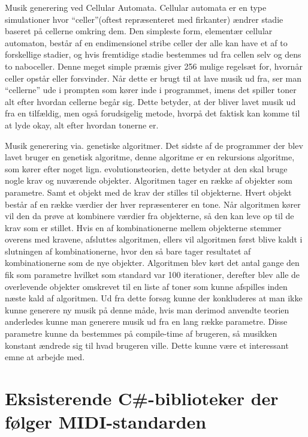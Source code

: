 Musik generering ved Cellular Automata.
Cellular automata er en type simulationer hvor “celler”(oftest repræsenteret med firkanter) ændrer stadie baseret på cellerne omkring dem. Den simpleste form, elementær cellular automaton, består af en endimensionel stribe celler der alle kan have et af to forskellige stadier, og hvis fremtidige stadie bestemmes ud fra cellen selv og dens to naboceller. Denne meget simple præmis giver 256 mulige regelsæt for, hvornår celler opstår eller forsvinder.\cite{wolframCA}
Når dette er brugt til at lave musik ud fra, ser man “cellerne” ude i prompten som kører inde i programmet, imens det spiller toner alt efter hvordan cellerne begår sig. Dette betyder, at der bliver lavet musik ud fra en tilfældig, men også forudsigelig metode, hvorpå det faktisk kan komme til at lyde okay, alt efter hvordan tonerne er. \cite{citation+needed}

Musik generering via. genetiske algoritmer.
Det sidste af de programmer der blev lavet bruger en genetisk algoritme, denne algoritme er en rekursions algoritme, som kører efter noget lign. evolutionsteorien, dette betyder at den skal bruge nogle krav og nuværende objekter. Algoritmen tager en række af objekter som parametre. Samt et objekt med de krav der stilles til objekterne. Hvert objekt består af en række værdier der hver repræsenterer en tone. 
Når algoritmen kører vil den da prøve at kombinere værdier fra objekterne, så den kan leve op til de krav som er stillet. Hvis en af kombinationerne mellem objekterne stemmer overens med kravene, afsluttes algoritmen, ellers vil algoritmen først blive kaldt i slutningen af kombinationerne, hvor den så bare tager resultatet af kombinationerne som de nye objekter.
Algoritmen blev kørt det antal gange den fik som parametre hvilket som standard var 100 iterationer, derefter blev alle de overlevende objekter omskrevet til en liste af toner som kunne afspilles inden næste kald af algoritmen. Ud fra dette forsøg kunne der konkluderes at man ikke kunne generere ny musik på denne måde, hvis man derimod anvendte teorien anderledes kunne man generere musik ud fra en lang række parametre. Disse parametre kunne da bestemmes på compile-time af brugeren, så musikken konstant ændrede sig til hvad brugeren ville. Dette kunne være et interessant emne at arbejde med.\cite{citation+needed}

\section {Eksisterende C#-biblioteker der følger MIDI-standarden} 
